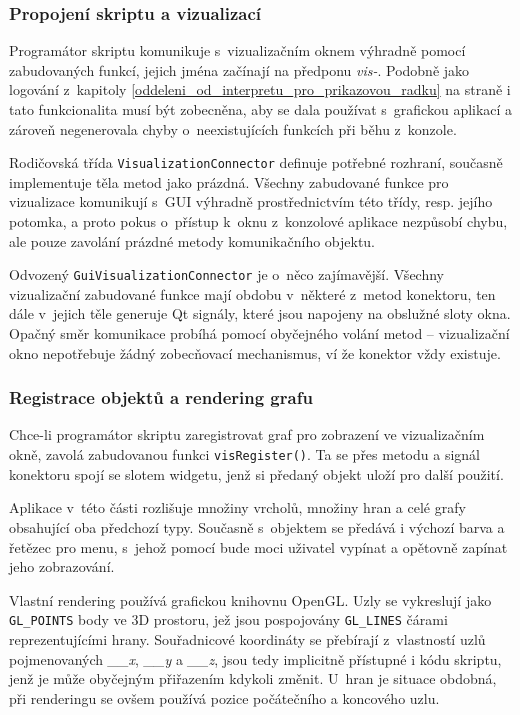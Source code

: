 \documentclass[11pt,twoside,a4paper]{book}
\begin{document}
\subsubsection{Propojení skriptu a vizualizací}

Programátor skriptu komunikuje s~vizualizačním oknem výhradně pomocí zabudovaných funkcí, jejich jména začínají na předponu \textit{vis-}. Podobně jako logování z~kapitoly \ref{oddeleni_od_interpretu_pro_prikazovou_radku} na straně \pageref{oddeleni_od_interpretu_pro_prikazovou_radku} i tato funkcionalita musí být zobecněna, aby se dala používat s~grafickou aplikací a zároveň negenerovala chyby o~neexistujících funkcích při běhu z~konzole.

Rodičovská třída \texttt{VisualizationConnector} definuje potřebné rozhraní, současně implementuje těla metod jako prázdná. Všechny zabudované funkce pro vizualizace komunikují s~GUI výhradně prostřednictvím této třídy, resp. jejího potomka, a proto pokus o~přístup k~oknu z~konzolové aplikace nezpůsobí chybu, ale pouze zavolání prázdné metody komunikačního objektu.

Odvozený \texttt{GuiVisualizationConnector} je o~něco zajímavější. Všechny vizualizační zabudované funkce mají obdobu v~některé z~metod konektoru, ten dále v~jejich těle generuje Qt signály, které jsou napojeny na obslužné sloty okna. Opačný směr komunikace probíhá pomocí obyčejného volání metod -- vizualizační okno nepotřebuje žádný zobecňovací mechanismus, ví že konektor vždy existuje.


\subsubsection{Registrace objektů a rendering grafu}

Chce-li programátor skriptu zaregistrovat graf pro zobrazení ve vizualizačním okně, zavolá zabudovanou funkci \texttt{visRegister()}. Ta se přes metodu a signál konektoru spojí se slotem widgetu, jenž si předaný objekt uloží pro další použití.

Aplikace v~této části rozlišuje množiny vrcholů, množiny hran a celé grafy obsahující oba předchozí typy. Současně s~objektem se předává i výchozí barva a řetězec pro menu, s~jehož pomocí bude moci uživatel vypínat a opětovně zapínat jeho zobrazování.

Vlastní rendering používá grafickou knihovnu OpenGL. Uzly se vykreslují jako \texttt{GL\_POINTS} body ve 3D prostoru, jež jsou pospojovány \texttt{GL\_LINES} čárami reprezentujícími hrany. Sou\-řad\-ni\-co\-vé koordináty se přebírají z~vlastností uzlů pojmenovaných \textit{\_\_x}, \textit{\_\_y} a \textit{\_\_z}, jsou tedy implicitně přístupné i kódu skriptu, jenž je může obyčejným přiřazením kdykoli změnit. U~hran je situace obdobná, při renderingu se ovšem používá pozice počátečního a koncového uzlu.
\end{document}
